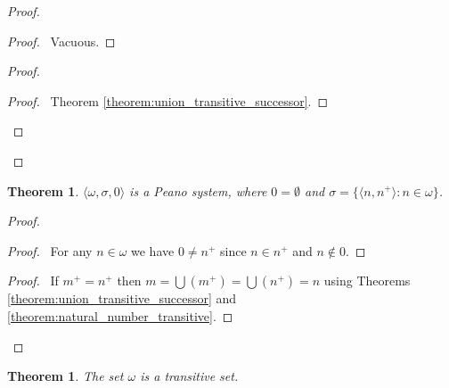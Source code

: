 \documentclass{report}
\let\qed\relax
\newtheorem{theorem}[axiom]{Theorem}
\theoremstyle{definition}
\newcommand{\ran}{\ensuremath{\operatorname{ran}}}
\begin{document}
    \begin{proof}
        \pf
        \begin{proof}
            \pf\ Vacuous.
        \end{proof}
        \begin{proof}
            \begin{proof}
                \pf\ Theorem \ref{theorem:union_transitive_successor}.
            \end{proof}
        \end{proof}
        \qed
    \end{proof}

    \begin{theorem}
        $\langle \omega, \sigma, 0 \rangle$ is a Peano system, where $0 = \emptyset$ and 
        $\sigma = \{ \langle n, n^+ \rangle : n \in \omega \}$.
    \end{theorem}

    \begin{proof}
        \pf
        \step{1}{$0 \notin \ran \sigma$}
        \begin{proof}
            \pf\ For any $n \in \omega$ we have $0 \neq n^+$ since $n \in n^+$
            and $n \notin 0$.
        \end{proof}
        \begin{proof}
            \pf\ If $m^+ = n^+$ then $m = \bigcup (m^+) = \bigcup (n^+) = n$ using Theorems
            \ref{theorem:union_transitive_successor} and \ref{theorem:natural_number_transitive}.
        \end{proof}
        \qed
    \end{proof}

    \begin{theorem}
        The set $\omega$ is a transitive set.
    \end{theorem}
\end{document}
